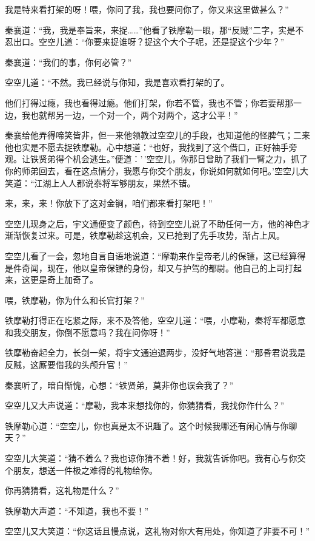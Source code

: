 \documentclass[12pt,oneside]{book}
\begin{document}
我是特来看打架的呀！喂，你问了我，我也要问你了，你又来这里做甚么？''

秦襄道：``我，我是奉旨来，来捉\ldots\ldots{}''他看了铁摩勒一眼，那``反贼''二字，实是不忍出口。空空儿道：``你要来捉谁呀？捉这个大个子呢，还是捉这个少年？''

秦襄道：``我们的事，你何必管？''

空空儿道：``不然。我已经说与你知，我是喜欢看打架的了。

他们打得过瘾，我也看得过瘾。他们打架，你若不管，我也不管；你若要帮那一边，我也就帮另一边，一个对一个，两个对两个，这才公平！''

秦襄给他弄得啼笑皆非，但一来他领教过空空儿的手段，也知道他的怪脾气；二来他也实是不愿去捉铁摩勒。心中想道：``也好，我找到了这个借口，正好袖手旁观。让铁贤弟得个机会逃生。''便道：'\,'空空儿，你那日曾助了我们一臂之力，抓了你的师弟回去，看在这点情分，我愿与你交个朋友，你说如何就如何吧。'空空儿大笑道：``江湖上人人都说泰将军够朋友，果然不错。

来，来，来！你放下了这对金锏，咱们都来看打架吧！''

空空儿现身之后，宇文通便变了颜色，待到空空儿说了不助任何一方，他的神色才渐渐恢复过来。可是，铁摩勒趁这机会，又已抢到了先手攻势，渐占上风。

空空儿看了一会，忽地自言自语地说道：``摩勒来作皇帝老儿的保镖，这已经算得是件奇闻，现在，他以皇帝保镖的身份，却又与护驾的都尉。他自己的上司打起来，这更是奇上加奇了。

喂，铁摩勒，你为什么和长官打架？''

铁摩勒打得正在吃紧之际，来不及答他，空空儿道：``喂，小摩勒，秦将军都愿意和我交朋友，你倒不愿意吗？我在问你呀！''

铁摩勒奋起全力，长剑一架，将宇文通迫退两步，没好气地答道：``那昏君说我是反贼，这厮要借我的头颅升官！''

秦襄听了，暗自惭愧，心想：``铁贤弟，莫非你也误会我了？''

空空儿又大声说道：``摩勒，我本来想找你的，你猜猜看，我找你作什么？''

铁摩勒心道：``空空儿，你也真是太不识趣了。这个时候我哪还有闲心情与你聊天？''

空空儿大笑道：``猜不着么？我也谅你猜不着！好，我就告诉你吧。我有心与你交个朋友，想送一件极之难得的礼物给你。

你再猜猜看，这礼物是什么？''

铁摩勒大声道：``不知道，我也不要！''

空空儿又大笑道：``你这话且慢点说，这礼物对你大有用处，你知道了非要不可！''
\end{document}
